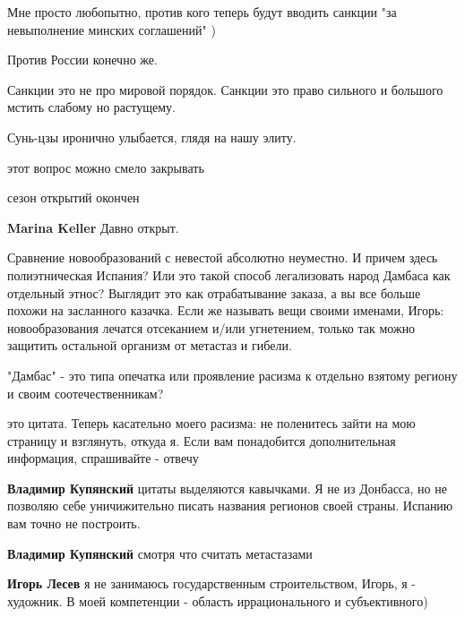 \begin{itemize}
\begin{itemize}
\end{itemize} %

Мне просто любопытно, против кого теперь будут вводить санкции "за невыполнение минских соглашений" )

\begin{itemize} %
Против России конечно же.

Санкции это не про мировой порядок. Санкции это право сильного и большого мстить слабому но растущему.
\end{itemize} %

Сунь-цзы иронично улыбается, глядя на нашу элиту.

этот вопрос можно смело закрывать

\begin{itemize} %
сезон открытий окончен

\textbf{Marina Keller} Давно открыт.
\end{itemize} %


Сравнение новообразований с невестой абсолютно неуместно. И причем здесь
полиэтническая Испания? Или это такой способ легализовать народ Дамбаса как
отдельный этнос? Выглядит это как отрабатывание заказа, а вы все больше похожи
на засланного казачка. Если же называть вещи своими именами, Игорь:
новообразования лечатся отсеканием и/или угнетением, только так можно защитить
остальной организм от метастаз и гибели.

\begin{itemize} %
"Дамбас" - это типа опечатка или проявление расизма к отдельно взятому региону и своим соотечественникам?


это цитата. Теперь касательно моего расизма: не поленитесь зайти на мою
страницу и взглянуть, откуда я. Если вам понадобится дополнительная информация,
спрашивайте - отвечу


\textbf{Владимир Купянский} цитаты выделяются кавычками. Я не из Донбасса, но не позволяю себе уничижительно писать названия регионов своей страны. Испанию вам точно не построить.

\textbf{Владимир Купянский} смотря что считать метастазами

\textbf{Игорь Лесев} я не занимаюсь государственным строительством, Игорь, я - художник. В моей компетенции - область иррационального и субъективного)


\end{itemize}
\end{itemize}
